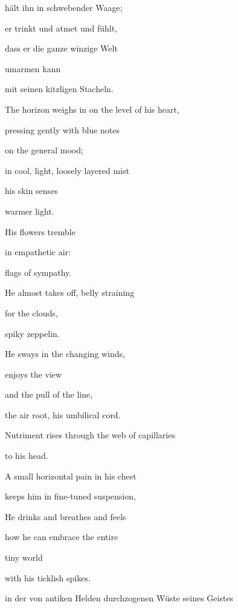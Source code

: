 \documentclass[a4paper]{article}
\begin{document}
hält ihn in schwebender Waage;

er trinkt und atmet und fühlt, 

dass er die ganze winzige Welt 

umarmen kann

mit seinen kitzligen Stacheln.



\bigskip

The horizon weighs in on the level of his heart,

pressing gently with blue notes

on the general mood;

in cool, light, loosely layered mist

his skin senses

warmer light.


\bigskip

His flowers tremble

in empathetic air: 

flags of sympathy.

He almost takes off, belly straining

for the clouds,

spiky zeppelin.


\bigskip

He sways in the changing winds,

enjoys the view

and the pull of the line,

the air root, his umbilical cord. 

Nutriment rises through the web of capillaries

to his head.


\bigskip

A small horizontal pain in his chest

keeps him in fine-tuned suspension,

He drinks and breathes and feels

how he can embrace the entire 

tiny world

with his ticklish spikes.


\bigskip



\bigskip


\bigskip

in der von antiken Helden durchzogenen Wüste seines Geistes


\bigskip
\end{document}
